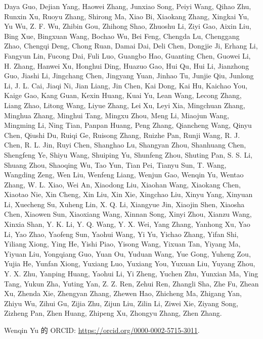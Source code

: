 \label{r1n-authors}
Daya Guo, Dejian Yang, Haowei Zhang, Junxiao Song, Peiyi Wang, Qihao Zhu, Runxin Xu, Ruoyu Zhang, Shirong Ma, Xiao Bi, Xiaokang Zhang, Xingkai Yu, Yu Wu, Z. F. Wu, Zhibin Gou, Zhihong Shao, Zhuoshu Li, Ziyi Gao, Aixin Liu, Bing Xue, Bingxuan Wang, Bochao Wu, Bei Feng, Chengda Lu, Chenggang Zhao, Chengqi Deng, Chong Ruan, Damai Dai, Deli Chen, Dongjie Ji, Erhang Li, Fangyun Lin, Fucong Dai, Fuli Luo, Guangbo Hao, Guanting Chen, Guowei Li, H. Zhang, Hanwei Xu, Honghui Ding, Huazuo Gao, Hui Qu, Hui Li, Jianzhong Guo, Jiashi Li, Jingchang Chen, Jingyang Yuan, Jinhao Tu, Junjie Qiu, Junlong Li, J. L. Cai, Jiaqi Ni, Jian Liang, Jin Chen, Kai Dong, Kai Hu, Kaichao You, Kaige Gao, Kang Guan, Kexin Huang, Kuai Yu, Lean Wang, Lecong Zhang, Liang Zhao, Litong Wang, Liyue Zhang, Lei Xu, Leyi Xia, Mingchuan Zhang, Minghua Zhang, Minghui Tang, Mingxu Zhou, Meng Li, Miaojun Wang, Mingming Li, Ning Tian, Panpan Huang, Peng Zhang, Qiancheng Wang, Qinyu Chen, Qiushi Du, Ruiqi Ge, Ruisong Zhang, Ruizhe Pan, Runji Wang, R. J. Chen, R. L. Jin, Ruyi Chen, Shanghao Lu, Shangyan Zhou, Shanhuang Chen, Shengfeng Ye, Shiyu Wang, Shuiping Yu, Shunfeng Zhou, Shuting Pan, S. S. Li, Shuang Zhou, Shaoqing Wu, Tao Yun, Tian Pei, Tianyu Sun, T. Wang, Wangding Zeng, Wen Liu, Wenfeng Liang, Wenjun Gao, Wenqin Yu, Wentao Zhang, W. L. Xiao, Wei An, Xiaodong Liu, Xiaohan Wang, Xiaokang Chen, Xiaotao Nie, Xin Cheng, Xin Liu, Xin Xie, Xingchao Liu, Xinyu Yang, Xinyuan Li, Xuecheng Su, Xuheng Lin, X. Q. Li, Xiangyue Jin, Xiaojin Shen, Xiaosha Chen, Xiaowen Sun, Xiaoxiang Wang, Xinnan Song, Xinyi Zhou, Xianzu Wang, Xinxia Shan, Y. K. Li, Y. Q. Wang, Y. X. Wei, Yang Zhang, Yanhong Xu, Yao Li, Yao Zhao, Yaofeng Sun, Yaohui Wang, Yi Yu, Yichao Zhang, Yifan Shi, Yiliang Xiong, Ying He, Yishi Piao, Yisong Wang, Yixuan Tan, Yiyang Ma, Yiyuan Liu, Yongqiang Guo, Yuan Ou, Yuduan Wang, Yue Gong, Yuheng Zou, Yujia He, Yunfan Xiong, Yuxiang Luo, Yuxiang You, Yuxuan Liu, Yuyang Zhou, Y. X. Zhu, Yanping Huang, Yaohui Li, Yi Zheng, Yuchen Zhu, Yunxian Ma, Ying Tang, Yukun Zha, Yuting Yan, Z. Z. Ren, Zehui Ren, Zhangli Sha, Zhe Fu, Zhean Xu, Zhenda Xie, Zhengyan Zhang, Zhewen Hao, Zhicheng Ma, Zhigang Yan, Zhiyu Wu, Zihui Gu, Zijia Zhu, Zijun Liu, Zilin Li, Ziwei Xie, Ziyang Song, Zizheng Pan, Zhen Huang, Zhipeng Xu, Zhongyu Zhang, Zhen Zhang.

Wenqin Yu 的 ORCID: \url{https://orcid.org/0000-0002-5715-3011}.
